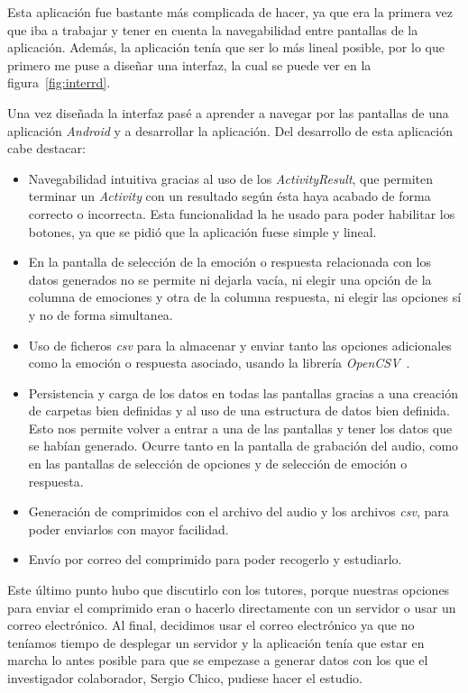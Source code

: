 Esta aplicación fue bastante más complicada de hacer, ya que era la primera vez que iba a trabajar y tener en cuenta la navegabilidad entre pantallas de la aplicación. Además, la aplicación tenía que ser lo más lineal posible, por lo que primero me puse a diseñar una interfaz, la cual se puede ver en la figura~\ref{fig:interrd}.

Una vez diseñada la interfaz pasé a aprender a navegar por las pantallas de una aplicación \textit{Android} y a desarrollar la aplicación. Del desarrollo de esta aplicación cabe destacar:
\begin{itemize}
	\item Navegabilidad intuitiva gracias al uso de los \textit{ActivityResult}, que permiten terminar un \textit{Activity} con un resultado según ésta haya acabado de forma correcto o incorrecta. Esta funcionalidad la he usado para poder habilitar los botones, ya que se pidió que la aplicación fuese simple y lineal.
	\item En la pantalla de selección de la emoción o respuesta relacionada con los datos generados no se permite ni dejarla vacía, ni elegir una opción de la columna de emociones y otra de la columna respuesta, ni elegir las opciones sí y no de forma simultanea.
	\item Uso de ficheros \textit{csv} para la almacenar y enviar tanto las opciones adicionales como la emoción o respuesta asociado, usando la librería \textit{OpenCSV}~\cite{opencsv}.
	\item Persistencia y carga de los datos en todas las pantallas gracias a una creación de carpetas bien definidas y al uso de una estructura de datos bien definida. Esto nos permite volver a entrar a una de las pantallas y tener los datos que se habían generado. Ocurre tanto en la pantalla de grabación del audio, como en las pantallas de selección de opciones y de selección de emoción o respuesta.
	\item Generación de comprimidos con el archivo del audio y los archivos \textit{csv}, para poder enviarlos con mayor facilidad.
	\item Envío por correo del comprimido para poder recogerlo y estudiarlo. 
\end{itemize}

Este último punto hubo que discutirlo con los tutores, porque nuestras opciones para enviar el comprimido eran o hacerlo directamente con un servidor o usar un correo electrónico. Al final, decidimos usar el correo electrónico ya que no teníamos tiempo de desplegar un servidor y la aplicación tenía que estar en marcha lo antes posible para que se empezase a generar datos con los que el investigador colaborador, Sergio Chico, pudiese hacer el estudio.

